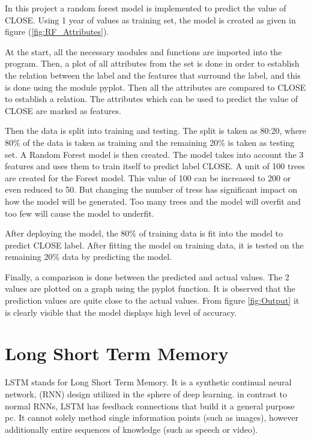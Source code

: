 \documentclass[BTech]{srmuthesis}
\begin{document}
In this project a random forest model is implemented to predict the value of CLOSE. Using 1 year of values as training set, the model is created as given in figure (\ref{fig:RF_Attributes}).

At the start, all the necessary modules and functions are imported into the program.
Then, a plot of all attributes from the set is done in order to establish the relation between the label and the features that surround the label, and this is done using the module pyplot. Then all the attributes are compared to CLOSE to establish a relation. The attributes which can be used to predict the value of CLOSE are marked as features.



Then the data is split into training and testing. The split is taken as 80:20, where 80\% of the data is taken as training and the remaining 20\% is taken as testing set. 
A Random Forest model is then created. The model takes into account the 3 features and uses them to train itself to predict label CLOSE. A unit of 100 trees are created for the Forest model. This value of 100 can be increased to 200 or even reduced to 50.
But changing the number of tress has significant impact on how the model will be generated. Too many trees and the model will overfit and too few will cause the model to underfit.

After deploying the model, the 80\% of training data is fit into the model to predict CLOSE label. After fitting the model on training data, it is tested on the remaining 20\% data by predicting the model. 

Finally, a comparison is done between the predicted and actual values. The 2 values are plotted on a graph using the pyplot function. It is observed that the prediction values are quite close to the actual values. From figure \ref{fig:Output} it is clearly visible that the model displays high level of accuracy.

\section{Long Short Term Memory}

LSTM stands for Long Short Term Memory. It is a synthetic continual neural network, (RNN) design utilized in the sphere of deep learning. in contrast to normal RNNs, LSTM has feedback connections that build it a general purpose pc. It cannot solely method single information points (such as images), however additionally entire sequences of knowledge (such as speech or video). 
\end{document}
